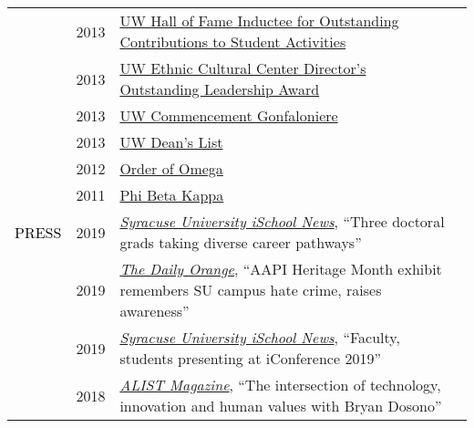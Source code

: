 \documentclass[12pt]{article}
\begin{document}
{{\begin{longtable}{Rp{1.0in}p{0.25in}p{4.75in}}
& \footnotesize{2013} & \href{https://depts.washington.edu/thehub/hub-events/hub-awards/}{{UW Hall of Fame Inductee for Outstanding Contributions to Student Activities}} \\

& \footnotesize{2013} & \href{https://www.facebook.com/EthnicCulturalCenter/photos/a.10151638127531422.1073741830.124987626421/10151638128881422/}{{UW Ethnic Cultural Center Director's Outstanding Leadership Award}} \\

& \footnotesize{2013} & \href{https://www.facebook.com/UWiSchool/posts/10151645734368695}{{UW Commencement Gonfaloniere}} \\

& \footnotesize{2013} & \href{https://www.yakimaherald.com/news/education/school-news-sept/article_af5885a3-bcbc-5925-bb87-a84844c6d36a.html}{{UW Dean's List}} \\

& \footnotesize{2012} & \href{http://orderofomega.org/}{{Order of Omega}} \\

& \footnotesize{2011} & \href{https://www.pbk.org/}{{Phi Beta Kappa}} \\

\textcolor{black}{\footnotesize{\uppercase{Press}}} 

& \footnotesize{2019} & \href{https://ischool.syr.edu/articles/news/view/three-doctoral-grads-taking-diverse-career-pathways-2019/}{\textit{{Syracuse University iSchool News}}}, ``Three doctoral grads taking diverse career pathways'' \\

& \footnotesize{2019} & \href{http://dailyorange.com/2019/04/aapi-heritage-month-exhibit-remembers-su-campus-hate-crime-raises-awareness/}{\textit{{The Daily Orange}}}, ``AAPI Heritage Month exhibit remembers SU campus hate crime, raises awareness'' \\

& \footnotesize{2019} & \href{https://ischool.syr.edu/articles/news/view/faculty-students-presenting-at-iconference-2019/}{\textit{{Syracuse University iSchool News}}}, ``Faculty, students presenting at iConference 2019'' \\

& \footnotesize{2018} & \href{https://issuu.com/alist_magazine/docs/alist_summer_2018_final}{\textit{{ALIST Magazine}}}, ``The intersection of technology, innovation and human values with Bryan Dosono'' \\


\end{longtable}}}
\end{document}
